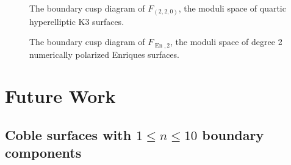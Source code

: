 \documentclass{amsart}
\begin{document}
\begin{remark}
\begin{figure}[H]
\centering

\caption{The boundary cusp diagram of $F_{(2,2,0)}$, the moduli space of quartic hyperelliptic K3 surfaces.}
\label{fig:220-cusps-diagram}
\end{figure}

\begin{figure}[H]
\centering

\caption{The boundary cusp diagram of $F_{\operatorname{En}, 2}$, the moduli space of degree 2 numerically polarized Enriques surfaces.}
\label{fig:sterk-cusp-diagram}
\end{figure}

\end{remark}

\section{Future Work}\label{future-work}

\subsection{\texorpdfstring{Coble surfaces with \(1\leq n\leq 10\) boundary components}{Coble surfaces with 1\textbackslash leq n\textbackslash leq 10 boundary components}}\label{coble-surfaces-with-1leq-nleq-10-boundary-components}
\end{document}

